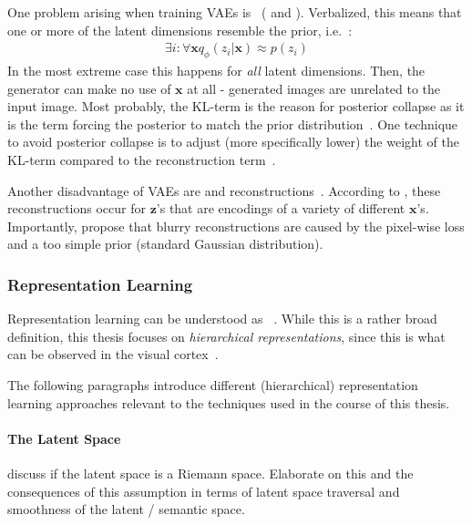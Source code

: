 One problem arising when training \acp{VAE} is ~(\citep{lucas2019understanding} and \citep[p. 694]{Goodfellow-et-al-2016}).
Verbalized, this means that one or more of the latent dimensions resemble the prior, i.e.~\citep{lucas2019understanding}:
\begin{align}
    \exists i: \forall \mathbf{x} q_{\phi}\left(z_{i} | \mathbf{x}\right) \approx p\left(z_{i}\right)
\end{align}
In the most extreme case this happens for \textit{all} latent dimensions.
Then, the generator can make no use of $\bm{x}$ at all - generated images are unrelated to the input image.
Most probably, the KL-term is the reason for posterior collapse as it is the term forcing the posterior to match the prior distribution~\citep{lucas2019understanding}.
One technique to avoid posterior collapse is to adjust (more specifically lower) the weight of the KL-term compared to the reconstruction term~\citep{lucas2019understanding}.

Another disadvantage of \acp{VAE} are  and  reconstructions~\citep{zhao2017towards}.
According to \citet{zhao2017towards}, these reconstructions occur for $\bm{z}$'s that are encodings of a variety of different $\bm{x}$'s.
Importantly, \citet{zhao2017towards} propose that blurry reconstructions are caused by the pixel-wise loss and a too simple prior (standard Gaussian distribution).

\subsubsection{Representation Learning}\label{subsubsec:representation_learning}

Representation learning can be understood as ~\citep{bengio2013representation}.
While this is a rather broad definition, this thesis focuses on \textit{hierarchical representations}, since this is what can be observed in the visual cortex~\citep{rodriguez2015hierarchical}.

The following paragraphs introduce different (hierarchical) representation learning approaches relevant to the techniques used in the course of this thesis.

\paragraph{The Latent Space}
\citet{shao2018riemannian,arvanitidis2017latent} discuss if the latent space is a Riemann space.
Elaborate on this and the consequences of this assumption in terms of latent space traversal and smoothness of the latent / semantic space.


